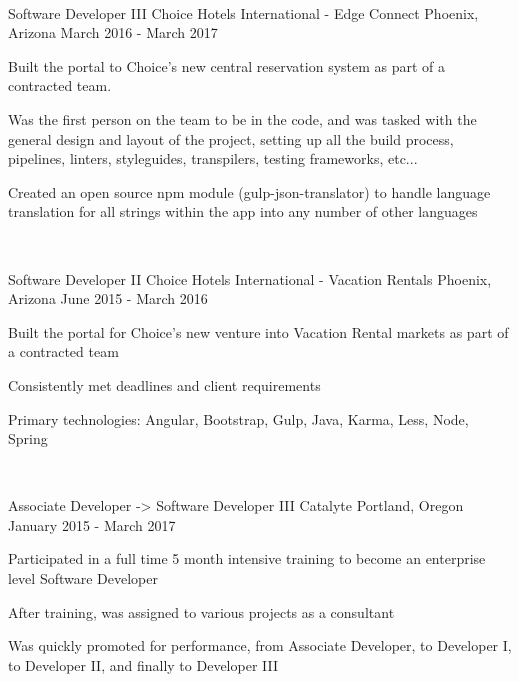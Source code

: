 \begin{cventries}
  ~

  \cventry
    {Software Developer III}
    {Choice Hotels International - Edge Connect}
    {Phoenix, Arizona}
    {March 2016 - March 2017}
    {
      \begin{cvitems}
        \item {Built the portal to Choice's new central reservation system as part of a contracted team.}
        \item {Was the first person on the team to be in the code, and was tasked with the general design and layout of the project, setting up all the build process, pipelines, linters, styleguides, transpilers, testing frameworks, etc...}
        \item {Created an open source npm module (gulp-json-translator) to handle language translation for all strings within the app into any number of other languages}
      \end{cvitems}
    }

  ~

  \cventry
    {Software Developer II}
    {Choice Hotels International - Vacation Rentals}
    {Phoenix, Arizona}
    {June 2015 - March 2016}
    {
      \begin{cvitems}
        \item {Built the portal for Choice's new venture into Vacation Rental markets as part of a contracted team}
        \item {Consistently met deadlines and client requirements}
        \item {Primary technologies: Angular, Bootstrap, Gulp, Java, Karma, Less, Node, Spring}
      \end{cvitems}
    }

  ~

  \cventry
    {Associate Developer -> Software Developer III}
    {Catalyte}
    {Portland, Oregon}
    {January 2015 - March 2017}
    {
      \begin{cvitems}
        \item {Participated in a full time 5 month intensive training to become an enterprise level Software Developer}
        \item {After training, was assigned to various projects as a consultant}
        \item {Was quickly promoted for performance, from Associate Developer, to Developer I, to Developer II, and finally to Developer III}
      \end{cvitems}
    }

\end{cventries}
